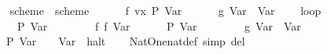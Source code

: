 \begin{isabellebody}
\ \ {}{}\isanewline
\isanewline
{}\isamarkupfalse%
\ scheme{}\ \ {}scheme{}\ {}\isanewline
\ \ {}\ {}\ {}{}\ f\ vx{}\ P\ {}Var\ {}{}\isanewline
\ \ {}\ {}\ {}{}\ g\ {}Var\ {}{}\ {}Var\ {}{}\isanewline
\ \ {}\ loop\isanewline
\ \ \ \ {}\ {}{}P\ {}Var\ {}{}{}\isanewline
\ \ \ \ {}\ {}\ {}{}\ f\ {}f\ {}Var\ {}{}{}\isanewline
\ \ \ \ {}\ P\ {}Var\ {}{}\isanewline
\ \ \ \ {}\ {}\ {}{}\ g\ {}Var\ {}{}\ {}Var\ {}{}\isanewline
\ \ \ \ {}\isanewline
\ \ {}\ P\ {}Var\ {}{}{}\ {}\ {}{}\ Var\ {}{}\ halt\isanewline
\ \ {}{}\isanewline
\isanewline
{}\isamarkupfalse%
\ Nat{}One{}nat{}def\ {}simp\ del{}\isanewline

\end{isabellebody}
